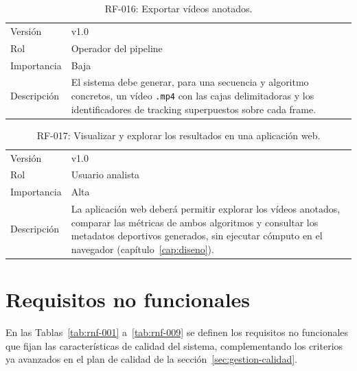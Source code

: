 \begin{table}[htp]
\centering
\caption{RF-016: Exportar vídeos anotados.}
\label{tab:rf-016}
\renewcommand{\arraystretch}{1.2}
\begin{tabular}{|p{3.1cm}|p{9.2cm}|}
\hline
\rowcolor{gray!25}
\multicolumn{2}{|l|}{\textbf{RF-016 -- Exportar vídeos anotados}} \\
\hline
Versión & v1.0 \\
\hline
Rol & Operador del pipeline \\
\hline
Importancia & Baja \\
\hline
Descripción & El sistema debe generar, para una secuencia y algoritmo
  concretos, un vídeo \texttt{.mp4} con las cajas delimitadoras y los
  identificadores de tracking superpuestos sobre cada frame. \\
\hline
\end{tabular}
\end{table}

\begin{table}[htp]
\centering
\caption{RF-017: Visualizar y explorar los resultados en una aplicación web.}
\label{tab:rf-017}
\renewcommand{\arraystretch}{1.2}
\begin{tabular}{|p{3.1cm}|p{9.2cm}|}
\hline
\rowcolor{gray!25}
\multicolumn{2}{|l|}{\textbf{RF-017 -- Visualizar y explorar los resultados en una aplicación web}} \\
\hline
Versión & v1.0 \\
\hline
Rol & Usuario analista \\
\hline
Importancia & Alta \\
\hline
Descripción & La aplicación web deberá permitir explorar los vídeos
  anotados, comparar las métricas de ambos algoritmos y consultar los
  metadatos deportivos generados, sin ejecutar cómputo en el navegador
  (capítulo~\ref{cap:diseno}). \\
\hline
\end{tabular}
\end{table}

\section{Requisitos no funcionales}
\label{sec:analisis-rnf}

En las Tablas~\ref{tab:rnf-001} a~\ref{tab:rnf-009} se definen los
requisitos no funcionales que fijan las características de calidad del
sistema, complementando los criterios ya avanzados en el plan de calidad de
la sección~\ref{sec:gestion-calidad}.

